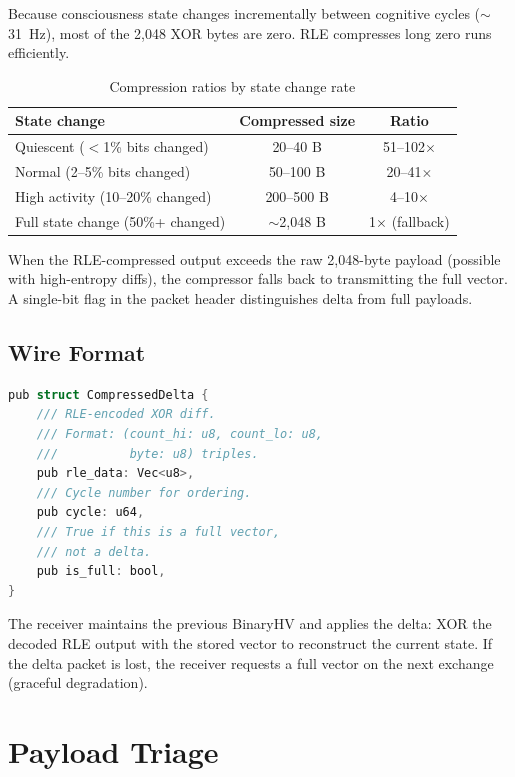 \documentclass[11pt,twocolumn]{article}
\begin{document}
Because consciousness state changes incrementally between cognitive
cycles ($\sim$31~Hz), most of the 2,048 XOR bytes are zero. RLE
compresses long zero runs efficiently.

\begin{table}[H]
\centering
\caption{Compression ratios by state change rate}
\label{tab:compression}
\scriptsize
\begin{tabular}{@{}lcc@{}}
\toprule
\textbf{State change} & \textbf{Compressed size} & \textbf{Ratio} \\
\midrule
Quiescent ($<$1\% bits changed) & 20--40 B & 51--102$\times$ \\
Normal (2--5\% bits changed) & 50--100 B & 20--41$\times$ \\
High activity (10--20\% changed) & 200--500 B & 4--10$\times$ \\
Full state change (50\%+ changed) & $\sim$2,048 B & 1$\times$ (fallback) \\
\bottomrule
\end{tabular}
\end{table}

When the RLE-compressed output exceeds the raw 2,048-byte payload (possible
with high-entropy diffs), the compressor falls back to transmitting the full
vector. A single-bit flag in the packet header distinguishes delta from full
payloads.

\subsection{Wire Format}

\begin{lstlisting}[language=C,caption={CompressedDelta wire format}]
pub struct CompressedDelta {
    /// RLE-encoded XOR diff.
    /// Format: (count_hi: u8, count_lo: u8,
    ///          byte: u8) triples.
    pub rle_data: Vec<u8>,
    /// Cycle number for ordering.
    pub cycle: u64,
    /// True if this is a full vector,
    /// not a delta.
    pub is_full: bool,
}
\end{lstlisting}

The receiver maintains the previous BinaryHV and applies the delta:
XOR the decoded RLE output with the stored vector to reconstruct the
current state. If the delta packet is lost, the receiver requests a
full vector on the next exchange (graceful degradation).

\section{Payload Triage}
\end{document}
